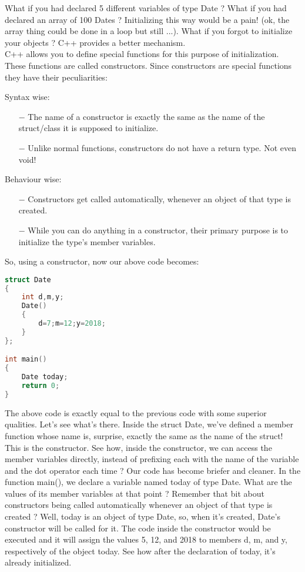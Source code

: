 \documentclass[11pt,fleqn]{book} %
\begin{document}
\noindent What if you had declared 5 different variables of type Date ? What if you had declared an array of 100 Dates ? Initializing this way would be a pain! (ok, the array thing could be done in a loop but still ...). What if you forgot to initialize your objects ? C++ provides a better mechanism.
\smallskip
~\\

\noindent C++ allows you to define special functions for this purpose of initialization. These functions are called constructors. Since constructors are special functions they have their peculiarities:

\smallskip

\noindent Syntax wise:
\begin{itemize}
	\item [$-$] The name of a constructor is exactly the same as the name of the struct/class it is supposed to initialize.
	\item [$-$] Unlike normal functions, constructors do not have a return type. Not even void!
\end{itemize}

\smallskip

\noindent Behaviour wise:
\begin{itemize}
	\item[$-$] Constructors get called automatically, whenever an object of that type is created.
	\item[$-$] While you can do anything in a constructor, their primary purpose is to initialize the type's member variables.
\end{itemize}

\noindent So, using a constructor, now our above code becomes:
\begin{lstlisting}[language=C++, caption = Constructor]
struct Date 
{
	int d,m,y;
	Date()
	{
		d=7;m=12;y=2018;
	}
};

int main() 
{
	Date today;
	return 0;
}
\end{lstlisting}

\noindent The above code is exactly equal to the previous code with some superior qualities. Let's see what's there. Inside the struct Date, we've defined a member function whose name is, surprise, exactly the same as the name of the struct! This is the constructor. See how, inside the constructor, we can access the member variables directly, instead of prefixing each with the name of the variable and the dot operator each time ? Our code has become briefer and cleaner. In the function main(), we declare a variable named today of type Date. What are the values of its member variables at that point ? Remember that bit about constructors being called automatically whenever an object of that type is created ? Well, today is an object of type Date, so, when it's created, Date's constructor will be called for it. The code inside the constructor would be executed and it will assign the values 5, 12, and 2018 to members d, m, and y, respectively of the object today. See how after the declaration of today, it's already initialized. 
\end{document}
